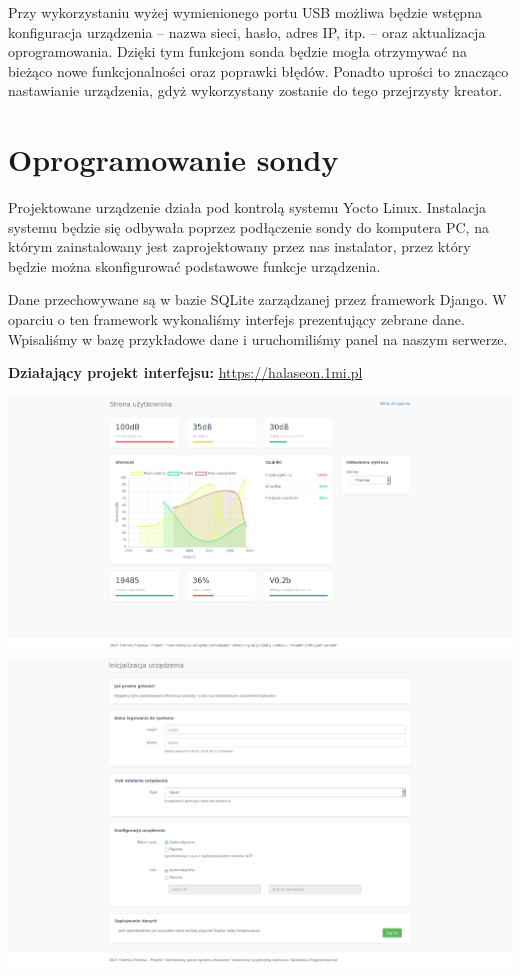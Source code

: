 \documentclass[12pt, a4paper]{article}
\begin{document}
Przy wykorzystaniu wyżej wymienionego portu USB możliwa będzie wstępna konfiguracja urządzenia -- nazwa sieci, hasło, adres IP, itp. -- oraz aktualizacja oprogramowania. Dzięki tym funkcjom sonda będzie mogła otrzymywać na bieżąco nowe funkcjonalności oraz poprawki błędów. Ponadto uprości to znacząco nastawianie urządzenia, gdyż wykorzystany zostanie do tego przejrzysty kreator.

\section{Oprogramowanie sondy}

Projektowane urządzenie działa pod kontrolą systemu Yocto Linux. Instalacja systemu będzie się odbywała poprzez podłączenie sondy do komputera PC, na którym zainstalowany jest zaprojektowany przez nas instalator, przez który będzie można skonfigurować podstawowe funkcje urządzenia.

Dane przechowywane są w bazie SQLite zarządzanej przez framework Django. W oparciu o ten framework wykonaliśmy interfejs prezentujący zebrane dane. Wpisaliśmy w bazę przykładowe dane i uruchomiliśmy panel na naszym serwerze.

\textbf{Działający projekt interfejsu:} \url{https://halaseon.1mi.pl}

\includegraphics[width=\textwidth]{web_page1.png}
\includegraphics[width=\textwidth]{web_page2.png}
\end{document}

